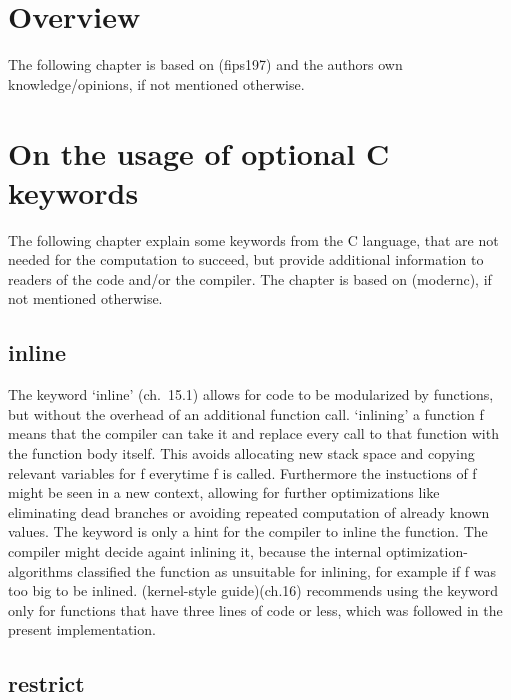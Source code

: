 \hypertarget{overview}{%
\section{Overview}\label{overview}}

The following chapter is based on (fips197) and the authors own
knowledge/opinions, if not mentioned otherwise.

\hypertarget{on-the-usage-of-optional-c-keywords}{%
\section{On the usage of optional C
keywords}\label{on-the-usage-of-optional-c-keywords}}

The following chapter explain some keywords from the C language, that
are not needed for the computation to succeed, but provide additional
information to readers of the code and/or the compiler. The chapter is
based on (modernc), if not mentioned otherwise.

\hypertarget{inline}{%
\subsection{inline}\label{inline}}

The keyword `inline' (ch.~15.1) allows for code to be modularized by
functions, but without the overhead of an additional function call.
`inlining' a function f means that the compiler can take it and replace
every call to that function with the function body itself. This avoids
allocating new stack space and copying relevant variables for f
everytime f is called. Furthermore the instuctions of f might be seen in
a new context, allowing for further optimizations like eliminating dead
branches or avoiding repeated computation of already known values. The
keyword is only a hint for the compiler to inline the function. The
compiler might decide againt inlining it, because the internal
optimization-algorithms classified the function as unsuitable for
inlining, for example if f was too big to be inlined. (kernel-style
guide)(ch.16) recommends using the keyword only for functions that have
three lines of code or less, which was followed in the present
implementation.

\hypertarget{restrict}{%
\subsection{restrict}\label{restrict}}

